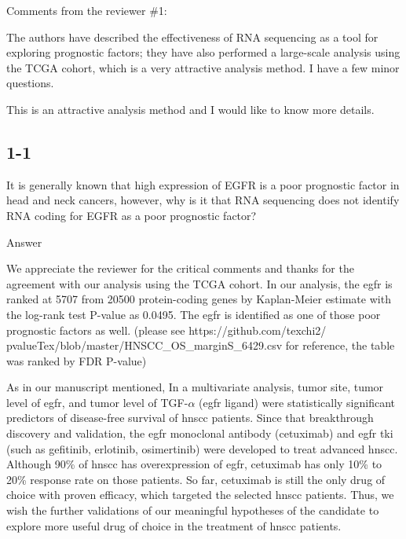 \documentclass[preprint,12pt]{elsarticle}
\newenvironment{MyColorPar}[1]{%
    \leavevmode\color{#1}\ignorespaces%
}{%
}%
\begin{document}
Comments from the reviewer \#1:

The authors have described the effectiveness of RNA sequencing as a tool for exploring prognostic factors; they have also performed a large-scale analysis using the TCGA cohort, which is a very attractive analysis method. I have a few minor questions.

This is an attractive analysis method and I would like to know more details.

\subsection*{1-1}
It is generally known that high expression of EGFR is a poor prognostic factor in head and neck cancers, however, why is it that RNA sequencing does not identify RNA coding for EGFR as a poor prognostic factor?

\begin{MyColorPar}{blue}
Answer

We appreciate the reviewer for the critical comments and thanks for the agreement with our analysis using the TCGA cohort.
In our analysis, the \acrshort{egfr} is ranked at 5707 from 20500 protein-coding genes %
by Kaplan-Meier estimate with the log-rank test P-value as 0.0495. The \acrshort{egfr} is identified as one of those poor prognostic factors as well. %
(please see https://github.com/texchi2/\linebreak
pvalueTex/blob/master/HNSCC\_OS\_marginS\_6429.csv for reference, the table was ranked by FDR P-value)

As in our manuscript mentioned, 
In a multivariate analysis, tumor site, tumor level of \acrshort{egfr}, and tumor level of TGF-$\alpha$ (\acrshort{egfr} ligand) were statistically significant predictors of disease-free survival of \acrshort{hnscc} patients\cite{Rusch1996}\cite{Grandis1998}.
Since that breakthrough discovery and validation, the \acrshort{egfr} monoclonal antibody (cetuximab)\cite{Bonner2006a} and \acrshort{egfr} \acrshort{tki} (such as gefitinib, erlotinib, osimertinib) were developed to treat advanced \acrshort{hnscc}. Although 90\% of \acrshort{hnscc} has overexpression of \acrshort{egfr}, cetuximab has only 10\% to 20\% response rate on those patients\cite{Johnson2020}. So far, cetuximab is still the only drug of choice with proven efficacy, which targeted the selected \acrshort{hnscc} patients\cite{Taberna2019}.
Thus, we wish the further validations of our meaningful hypotheses of the candidate to explore more useful drug of choice in the treatment of \acrshort{hnscc} patients.
\end{MyColorPar}
\end{document}
